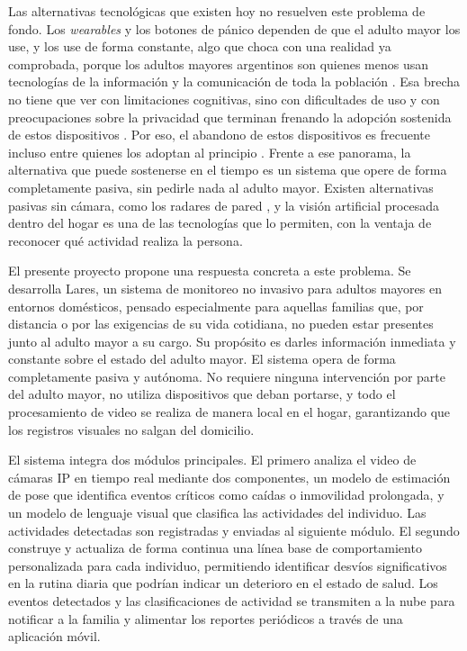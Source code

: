 Las alternativas tecnológicas que existen hoy no resuelven este problema de fondo.
Los \textit{wearables} y los botones de pánico dependen de que el adulto mayor los use, y los use de forma constante, algo que choca con una realidad ya comprobada, porque los adultos mayores argentinos son quienes menos usan tecnologías de la información y la comunicación de toda la población \parencite{INDEC2020}.
Esa brecha no tiene que ver con limitaciones cognitivas, sino con dificultades de uso y con preocupaciones sobre la privacidad que terminan frenando la adopción sostenida de estos dispositivos \parencite{Lam2025}.
Por eso, el abandono de estos dispositivos es frecuente incluso entre quienes los adoptan al principio \parencite{MunozEsquivel2023}.
Frente a ese panorama, la alternativa que puede sostenerse en el tiempo es un sistema que opere de forma completamente pasiva, sin pedirle nada al adulto mayor.
Existen alternativas pasivas sin cámara, como los radares de pared \parencite{Vayyar}, y la visión artificial procesada dentro del hogar es una de las tecnologías que lo permiten, con la ventaja de reconocer qué actividad realiza la persona.

El presente proyecto propone una respuesta concreta a este problema.
Se desarrolla Lares, un sistema de monitoreo no invasivo para adultos mayores en entornos domésticos, pensado especialmente para aquellas familias que, por distancia o por las exigencias de su vida cotidiana, no pueden estar presentes junto al adulto mayor a su cargo.
Su propósito es darles información inmediata y constante sobre el estado del adulto mayor.
El sistema opera de forma completamente pasiva y autónoma.
No requiere ninguna intervención por parte del adulto mayor, no utiliza dispositivos que deban portarse, y todo el procesamiento de video se realiza de manera local en el hogar, garantizando que los registros visuales no salgan del domicilio.

El sistema integra dos módulos principales.
El primero analiza el video de cámaras IP en tiempo real mediante dos componentes, un modelo de estimación de pose que identifica eventos críticos como caídas o inmovilidad prolongada, y un modelo de lenguaje visual que clasifica las actividades del individuo.
Las actividades detectadas son registradas y enviadas al siguiente módulo.
El segundo construye y actualiza de forma continua una línea base de comportamiento personalizada para cada individuo, permitiendo identificar desvíos significativos en la rutina diaria que podrían indicar un deterioro en el estado de salud.
Los eventos detectados y las clasificaciones de actividad se transmiten a la nube para notificar a la familia y alimentar los reportes periódicos a través de una aplicación móvil.

